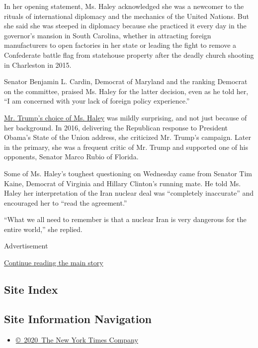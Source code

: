 In her opening statement, Ms. Haley acknowledged she was a newcomer to
the rituals of international diplomacy and the mechanics of the United
Nations. But she said she was steeped in diplomacy because she practiced
it every day in the governor's mansion in South Carolina, whether in
attracting foreign manufacturers to open factories in her state or
leading the fight to remove a Confederate battle flag from statehouse
property after the deadly church shooting in Charleston in 2015.

Senator Benjamin L. Cardin, Democrat of Maryland and the ranking
Democrat on the committee, praised Ms. Haley for the latter decision,
even as he told her, ``I am concerned with your lack of foreign policy
experience.''

\href{https://www.nytimes.com/2016/11/23/us/nikki-haley-donald-trump-un-ambassador.html}{Mr.
Trump's choice of Ms. Haley} was mildly surprising, and not just because
of her background. In 2016, delivering the Republican response to
President Obama's State of the Union address, she criticized Mr. Trump's
campaign. Later in the primary, she was a frequent critic of Mr. Trump
and supported one of his opponents, Senator Marco Rubio of Florida.

Some of Ms. Haley's toughest questioning on Wednesday came from Senator
Tim Kaine, Democrat of Virginia and Hillary Clinton's running mate. He
told Ms. Haley her interpretation of the Iran nuclear deal was
``completely inaccurate'' and encouraged her to ``read the agreement.''

``What we all need to remember is that a nuclear Iran is very dangerous
for the entire world,'' she replied.

Advertisement

\protect\hyperlink{after-bottom}{Continue reading the main story}

\hypertarget{site-index}{%
\subsection{Site Index}\label{site-index}}

\hypertarget{site-information-navigation}{%
\subsection{Site Information
Navigation}\label{site-information-navigation}}

\begin{itemize}
\tightlist
\item
  \href{https://help.nytimes.com/hc/en-us/articles/115014792127-Copyright-notice}{©~2020~The
  New York Times Company}
\end{itemize}

